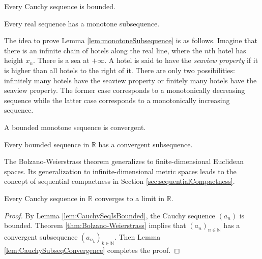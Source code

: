 \begin{lem}
  \label{lem:CauchySeqIsBounded}
  Every Cauchy sequence is bounded.
\end{lem}

\begin{lem}
  \label{lem:monotoneSubsequence}
  Every real sequence has a monotone subsequence.
\end{lem}

\begin{rem}
  The idea to prove Lemma \ref{lem:monotoneSubsequence} is as follows.
  Imagine that there is an infinite chain of hotels
  along the real line,
  where the $n$th hotel has height $x_n$.
  There is a sea at $+\infty$.
  A hotel is said to have the \emph{seaview property}
  if it is higher than all hotels to the right of it.
  There are only two possibilities:
  infinitely many hotels have the seaview property
  or finitely many hotels have the seaview property.
  The former case corresponds to a monotonically decreasing sequence
  while
  the latter case corresponds to a monotonically increasing sequence.
\end{rem}

\begin{thm}
  \label{thm:boundedMonotoneSeqIsConvergent}
  A bounded monotone sequence is convergent.
\end{thm}

\begin{thm}
  \label{thm:Bolzano-Weierstrass}
  Every bounded sequence in $\mathbb{R}$
  has a convergent subsequence.
\end{thm}

\begin{rem}
  The Bolzano-Weierstrass theorem generalizes
  to finite-dimensional Euclidean spaces.
  Its generalization to infinite-dimensional metric spaces
  leads to the concept of sequential compactness
  in Section \ref{sec:sequentialCompactness}. 
\end{rem}

\begin{thm}%
  \label{thm:realCauchySeqConverges}
  Every Cauchy sequence in $\mathbb{R}$
  converges to a limit in $\mathbb{R}$.
\end{thm}
\begin{proof}
  By Lemma \ref{lem:CauchySeqIsBounded},
  the Cauchy sequence $(a_n)$ is bounded.
  Theorem \ref{thm:Bolzano-Weierstrass}
  implies that $(a_n)_{n\in \mathbb{N}}$ has a convergent
  subsequence $(a_{n_k})_{k\in \mathbb{N}}$.
  Then Lemma \ref{lem:CauchySubseqConvergence}
  completes the proof.
\end{proof}

